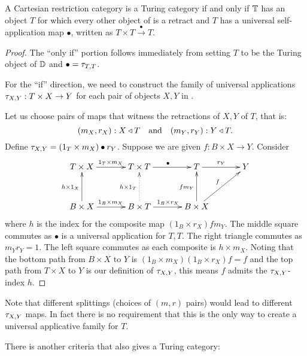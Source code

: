 \begin{theorem}\label{thm:turing_recognition}
  A Cartesian restriction category \D is a Turing category if and only if $\mathbb{T}$ has an object $T$
  for which every other object of \D is a retract and $T$ has a universal self-application map
  $\bullet$, written as $T\times T \xrightarrow{\ \bullet\ }T$.
\end{theorem}
\begin{proof}
  The ``only if'' portion follows immediately from setting $T$ to be the Turing object of $\mathbb{D}$ and
  $\bullet = \tau_{{T},{T}}$.

  For the ``if'' direction, we need to construct the family of universal applications
  $\tau_{{X},{Y}} : T\times X \to Y$ for each pair of objects $X,Y$ in \D.

  Let us choose pairs of maps that witness the retractions of $X, Y$ of $T$, that is:
  \[
    (m_X,r_X):X \triangleleft T \quad\text{and}\quad(m_Y,r_Y):Y \triangleleft T.
  \]
  Define $\tau_{{X},{Y}} = (1_T\times m_X ) \bullet r_Y$. Suppose we are given $f:B\times X \to Y$. Consider
  \[
    \xymatrix@C+10pt@R+10pt{
      T \times X \ar[r]^{1_T\times m_X} & T\times T \ar[r]^{\bullet} & T \ar[r]^{r_Y} & Y \\
      B \times X \ar[r]^{1_B\times m_X} \ar[u]^{h\times 1_X}
        & B \times T \ar@{.>}[u]^{h\times 1_T} \ar[r]^{1_B \times r_X}
        & B \times X \ar[ur]^{f} \ar[u]^{f m_Y}
      }
  \]
  where $h$ is the index for the composite map $(1_B \times r_X) f m_Y$. The middle square commutes
  as $\bullet$ is a universal application for $T,T$. The right triangle commutes as $m_Y r_Y =1$.
  The left square commutes as each composite is $h \times m_X$. Noting that the bottom path from
  $B\times X$ to $Y$ is $(1_B \times m_X)(1_B \times r_X)f = f$ and the top path from $T\times X$ to
  $Y$ is our definition of $\tau_{{X},{Y}}$, this means $f$ admits the $\tau_{{X},{Y}}$-index $h$.
\end{proof}

Note that different splittings (choices of $(m,r)$ pairs) would lead to different $\tau_{{X},{Y}}$ maps. In
fact there is no requirement that this is the only way to create a universal applicative family
for $T$.

There is another criteria that also gives a Turing category:

